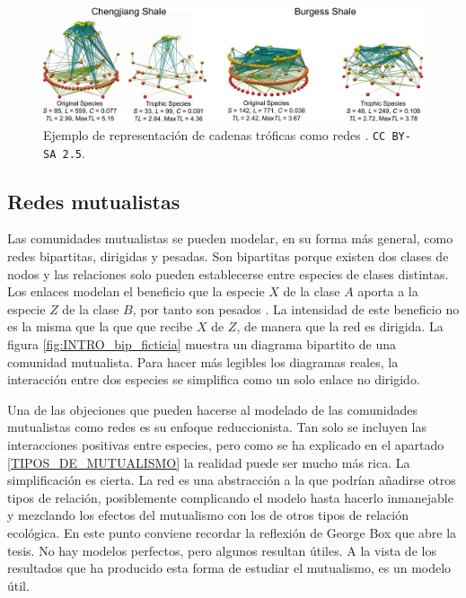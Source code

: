 \begin{figure}[h!]
\centering
\includegraphics[scale=0.75]{Figures/INTRO_Chengjiang_and_Burgess_Shale_1.png}
\caption{Ejemplo de representación de cadenas tróficas como redes \cite{dunne2008compilation}. \small{\texttt{CC BY-SA 2.5}}.}
\label{fig:INTRO_Chengjiang_and_Burgess_Shale_1}
\end{figure}


\subsection{Redes mutualistas}

Las comunidades mutualistas se pueden modelar, en su forma más general, como redes bipartitas, dirigidas y pesadas. Son bipartitas porque existen dos clases de nodos y las relaciones solo pueden establecerse entre especies de clases distintas. Los enlaces modelan el beneficio que la especie $X$ de la clase $A$ aporta a la especie $Z$ de la clase $B$, por tanto son pesados \cite{barrat2004architecture}. La intensidad de este beneficio no es la misma que la que que recibe $X$ de $Z$, de manera que la red es dirigida. La figura \ref{fig:INTRO_bip_ficticia} muestra un diagrama bipartito de una comunidad mutualista. Para hacer más legibles los diagramas reales, la interacción entre dos especies se simplifica como un solo enlace no dirigido.

Una de las objeciones que pueden hacerse al modelado de las comunidades mutualistas como redes es su enfoque reduccionista. Tan solo se incluyen las interacciones positivas entre especies, pero como se ha explicado en el apartado \ref{TIPOS_DE_MUTUALISMO} la realidad puede ser mucho más rica. La simplificación es cierta. La red es una abstracción a la que podrían añadirse otros tipos de relación, posiblemente complicando el modelo hasta hacerlo inmanejable y mezclando los efectos del mutualismo con los de otros tipos de relación ecológica. En este punto conviene recordar la reflexión de George Box que abre la tesis. No hay modelos perfectos, pero algunos resultan útiles. A la vista de los resultados que ha producido esta forma de estudiar el mutualismo, es un modelo útil.


